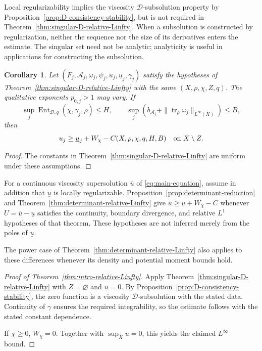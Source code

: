 \documentclass[oneside,english,letterpaper]{amsart}
\numberwithin{equation}{section}
\theoremstyle{plain}
\newtheorem{cor}[thm]{Corollary}
\theoremstyle{definition}
\theoremstyle{remark}
\begin{document}
Local regularizability implies the viscosity $\mathcal D$-subsolution
property by Proposition~\ref{prop:D-consistency-stability},
but is not required in Theorem~\ref{thm:singular-D-relative-Linfty}.
When a subsolution is constructed by regularization, neither the
sequence nor the size of its derivatives enters the estimate.
The singular set need not be analytic; analyticity is useful in
applications for constructing the subsolution.

\begin{cor}
	\label{cor:singular-D-uniform-family}
	Let $(F_j,\mathcal A_j,\omega_j,\psi_j,u_j,\underline u_j,\gamma_j)$
	satisfy the hypotheses of
	Theorem~\ref{thm:singular-D-relative-Linfty} with the same
	$(X,\rho,\chi,Z,q)$. The qualitative exponents $p_{0,j}>1$ may vary.
	If
	$$
	\sup_j\operatorname{Ent}_{\mathcal D,q}(\chi,\gamma_j,\rho)\leq H,
	\qquad
	\sup_j\left(b_{\mathcal A_j}
	+\|\operatorname{tr}_\rho\omega_j\|_{L^\infty(X)}\right)\leq B,
	$$
	then
	$$
	u_j\geq\underline u_j+W_\chi-C(X,\rho,\chi,q,H,B)
	\quad\hbox{on }X\setminus Z.
	$$
\end{cor}

\begin{proof}
	The constants in Theorem~\ref{thm:singular-D-relative-Linfty} are
	uniform under these assumptions.
\end{proof}

For a continuous viscosity supersolution $\overline u$ of
\eqref{eq:main-equation}, assume in addition that $\underline u$
is locally regularizable. Proposition~\ref{prop:determinant-reduction}
and Theorem~\ref{thm:determinant-relative-Linfty} give
$\overline u\geq\underline u+W_\chi-C$ whenever
$U=\overline u-\underline u$ satisfies the
continuity, boundary divergence, and relative $L^1$ hypotheses of
that theorem. These hypotheses are not inferred merely from the
poles of $\underline u$.

The power case of Theorem~\ref{thm:determinant-relative-Linfty}
also applies to these differences whenever its density and potential
moment bounds hold.


\begin{proof}[Proof of Theorem~\ref{thm:intro-relative-Linfty}]
	Apply Theorem~\ref{thm:singular-D-relative-Linfty} with
	$Z=\varnothing$ and $\underline u=0$.
	By Proposition~\ref{prop:D-consistency-stability}, the zero
	function is a viscosity $\mathcal D$-subsolution with the stated
	data. Continuity of $\gamma$ ensures the required integrability,
	so the estimate follows with the stated constant dependence.
	
	If $\chi\geq0$, $W_\chi=0$. Together with
	$\sup_Xu=0$, this yields the claimed $L^\infty$ bound.
\end{proof}
\end{document}
